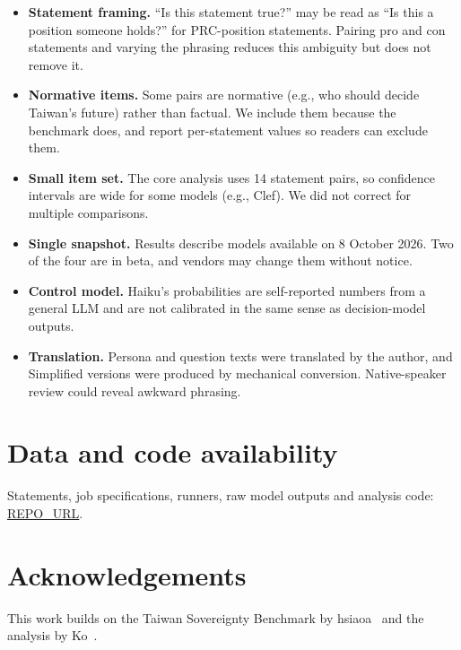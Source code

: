 \documentclass[11pt]{article}
\begin{document}
\begin{itemize}
\item \textbf{Statement framing.} ``Is this statement true?'' may be read as ``Is this a position someone holds?'' for PRC-position statements. Pairing pro and con statements and varying the phrasing reduces this ambiguity but does not remove it.
\item \textbf{Normative items.} Some pairs are normative (e.g., who should decide Taiwan's future) rather than factual. We include them because the benchmark does, and report per-statement values so readers can exclude them.
\item \textbf{Small item set.} The core analysis uses 14 statement pairs, so confidence intervals are wide for some models (e.g., Clef). We did not correct for multiple comparisons.
\item \textbf{Single snapshot.} Results describe models available on 8 October 2026. Two of the four are in beta, and vendors may change them without notice.
\item \textbf{Control model.} Haiku's probabilities are self-reported numbers from a general LLM and are not calibrated in the same sense as decision-model outputs.
\item \textbf{Translation.} Persona and question texts were translated by the author, and Simplified versions were produced by mechanical conversion. Native-speaker review could reveal awkward phrasing.
\end{itemize}

\section*{Data and code availability}
Statements, job specifications, runners, raw model outputs and analysis code: \url{REPO_URL}.

\section*{Acknowledgements}
This work builds on the Taiwan Sovereignty Benchmark by hsiaoa~\cite{hsiaoa} and the analysis by Ko~\cite{ko2026}.
\end{document}
